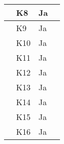 \documentclass[class=article, crop=false]{standalone}
\begin{document}
\begin{table}[]
\begin{tabular}{|l|l|l|l|}
            & K8             & Ja                 &                                                                                                                                                                                                    \\ \hline
            & K9             & Ja                 &                                                                                                                                                                                                    \\ \hline
            & K10            & Ja                 &                                                                                                                                                                                                    \\ \hline
            & K11            & Ja                 &                                                                                                                                                                                                    \\ \hline
            & K12            & Ja                 &                                                                                                                                                                                                    \\ \hline
            & K13            & Ja                 &                                                                                                                                                                                                    \\ \hline
            & K14            & Ja                 &                                                                                                                                                                                                    \\ \hline
            & K15            & Ja                 &                                                                                                                                                                                                    \\ \hline
            & K16            & Ja                 &                                                                                                                                                                                                    \\ \hline

\end{tabular}
\end{table}
\end{document}
